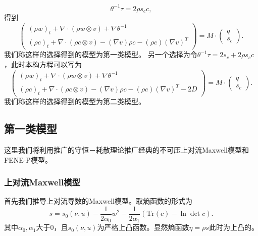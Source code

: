 	\begin{equation*}
		\theta^{-1} \tau = 2 \rho s_c c,
	\end{equation*}
	得到
	\begin{equation} \label{eq:ECDFgeneral1}
		\left( \begin{array}{c} 
			(\rho w)_t +  \nabla \cdot (\rho w \otimes v)  + \nabla \theta^{-1} \\
			(\rho c)_t +  \nabla \cdot (\rho c \otimes v) - (\nabla v) \rho c - (\rho c) (\nabla v)^T 
		\end{array} \right) = M \cdot
		\left( \begin{array}{c} 
			q \\ s_c
		\end{array}\right).
	\end{equation}
	我们称这样的选择得到的模型为第一类模型。
	另一个选择为令$\theta^{-1} \tau = 2 s_c + 2 \rho s_c c$，此时本构方程可以写为
	\begin{equation}
	\left( \begin{array}{c} 
			(\rho w)_t +  \nabla \cdot (\rho w \otimes v)  + \nabla \theta^{-1} \\
			(\rho c)_t +  \nabla \cdot (\rho c \otimes v) - (\nabla v) \rho c - (\rho c) (\nabla v)^T - 2 D 
		\end{array} \right) = M \cdot
		\left( \begin{array}{c} 
			q \\ s_c
		\end{array}\right).	
	\end{equation}
	我们称这样的选择得到的模型为第二类模型。

	\subsection{第一类模型}
	这里我们将利用推广的守恒－耗散理论推广经典的不可压上对流Maxwell模型和FENE-P模型。
	\subsubsection{上对流Maxwell模型}
	首先我们推导上对流导数的Maxwell模型。取熵函数的形式为
	\begin{equation*}
			s = s_0(\nu,u)  - \frac{1}{2  \alpha_0} w^2 - \frac{1}{2  \alpha_1} (\mbox{Tr}(c) - \ln \det c).
	\end{equation*}
	其中$\alpha_0,\alpha_1$大于$0$，且$s_0(\nu,u)$为严格上凸函数。显然熵函数$\eta = \rho s$此时为上凸的。
	

